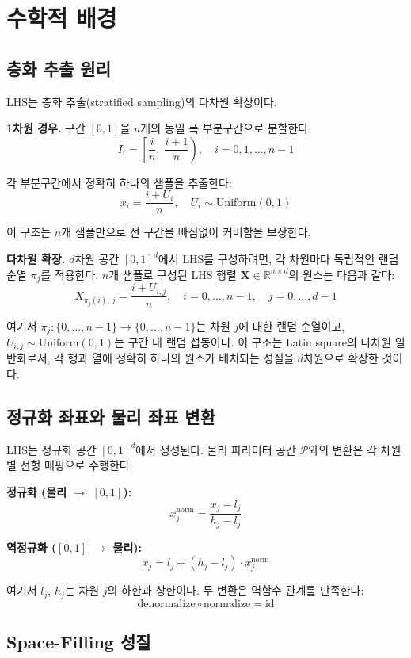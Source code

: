 \documentclass[11pt]{article}
\begin{document}
\section{수학적 배경}

\subsection{층화 추출 원리}

LHS는 층화 추출(stratified sampling)의 다차원 확장이다.

\textbf{1차원 경우.} 구간 $[0, 1]$을 $n$개의 동일 폭 부분구간으로 분할한다:
\[
I_i = \left[\frac{i}{n},\; \frac{i+1}{n}\right), \quad i = 0, 1, \dots, n-1
\]

각 부분구간에서 정확히 하나의 샘플을 추출한다:
\[
x_i = \frac{i + U_i}{n}, \quad U_i \sim \mathrm{Uniform}(0, 1)
\]

이 구조는 $n$개 샘플만으로 전 구간을 빠짐없이 커버함을 보장한다.

\textbf{다차원 확장.} $d$차원 공간 $[0,1]^d$에서 LHS를 구성하려면,
각 차원마다 독립적인 랜덤 순열 $\pi_j$를 적용한다.
$n$개 샘플로 구성된 LHS 행렬 $\mathbf{X} \in \mathbb{R}^{n \times d}$의 원소는 다음과 같다:
\[
X_{\pi_j(i),\, j} = \frac{i + U_{i,j}}{n}, \quad i = 0, \dots, n-1, \quad j = 0, \dots, d-1
\]

여기서 $\pi_j : \{0, \dots, n-1\} \to \{0, \dots, n-1\}$는 차원 $j$에 대한 랜덤 순열이고,
$U_{i,j} \sim \mathrm{Uniform}(0, 1)$는 구간 내 랜덤 섭동이다.
이 구조는 Latin square의 다차원 일반화로서,
각 행과 열에 정확히 하나의 원소가 배치되는 성질을 $d$차원으로 확장한 것이다.

\subsection{정규화 좌표와 물리 좌표 변환}

LHS는 정규화 공간 $[0,1]^d$에서 생성된다.
물리 파라미터 공간 $\mathcal{P}$와의 변환은 각 차원별 선형 매핑으로 수행한다.

\textbf{정규화 (물리 $\to$ $[0,1]$):}
\[
x_j^{\mathrm{norm}} = \frac{x_j - l_j}{h_j - l_j}
\]

\textbf{역정규화 ($[0,1]$ $\to$ 물리):}
\[
x_j = l_j + (h_j - l_j) \cdot x_j^{\mathrm{norm}}
\]

여기서 $l_j$, $h_j$는 차원 $j$의 하한과 상한이다.
두 변환은 역함수 관계를 만족한다:
\[
\mathrm{denormalize} \circ \mathrm{normalize} = \mathrm{id}
\]

\subsection{Space-Filling 성질}
\end{document}
